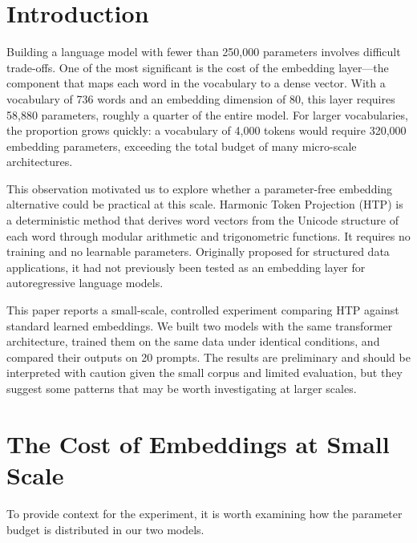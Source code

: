 \documentclass[10pt,twocolumn,a4paper]{article}
\newcommand{\htpname}{HTP}
\begin{document}
\section{Introduction}
\label{sec:introduction}

Building a language model with fewer than 250,000 parameters involves difficult trade-offs. One of the most significant is the cost of the embedding layer---the component that maps each word in the vocabulary to a dense vector. With a vocabulary of 736 words and an embedding dimension of 80, this layer requires 58,880 parameters, roughly a quarter of the entire model. For larger vocabularies, the proportion grows quickly: a vocabulary of 4,000 tokens would require 320,000 embedding parameters, exceeding the total budget of many micro-scale architectures.

This observation motivated us to explore whether a parameter-free embedding alternative could be practical at this scale. Harmonic Token Projection (\htpname{}) \cite{schmitz2025htp} is a deterministic method that derives word vectors from the Unicode structure of each word through modular arithmetic and trigonometric functions. It requires no training and no learnable parameters. Originally proposed for structured data applications, it had not previously been tested as an embedding layer for autoregressive language models.

This paper reports a small-scale, controlled experiment comparing \htpname{} against standard learned embeddings. We built two models with the same transformer architecture, trained them on the same data under identical conditions, and compared their outputs on 20 prompts. The results are preliminary and should be interpreted with caution given the small corpus and limited evaluation, but they suggest some patterns that may be worth investigating at larger scales.

\section{The Cost of Embeddings at Small Scale}
\label{sec:problem}

To provide context for the experiment, it is worth examining how the parameter budget is distributed in our two models.
\end{document}
